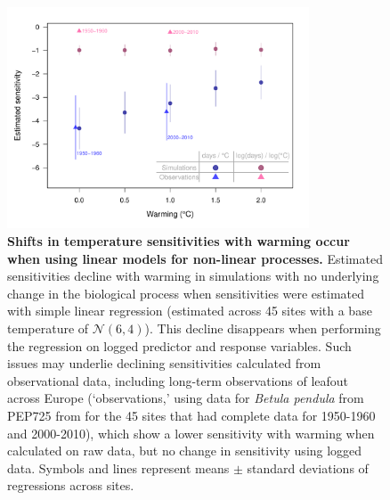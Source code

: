 \documentclass[11pt,letter]{article}
\begin{document}
\begin{figure}[h!]
\centering
\noindent \includegraphics[width=0.8\textwidth]{..//analyses/figures/basicsimsandpep.pdf}
\caption{\textbf{Shifts in temperature sensitivities with warming occur when using linear models for non-linear processes.} Estimated sensitivities decline with warming in simulations with no underlying change in the biological process when sensitivities were estimated with simple linear regression (estimated across 45 sites with a base temperature of $\mathcal{N}(6,4)$). This decline disappears when performing the regression on logged predictor and response variables. Such issues may underlie declining sensitivities calculated from observational data, including long-term observations of leafout across Europe (`observations,' using data for \emph{Betula pendula} from PEP725 from for the 45 sites that had complete data for 1950-1960 and 2000-2010), which show a lower sensitivity with warming when calculated on raw data, but no change in sensitivity using logged data. Symbols and lines represent means $\pm$ standard deviations of regressions across sites. } %
\label{fig:basicsimswpep} %
\end{figure}
\end{document}
